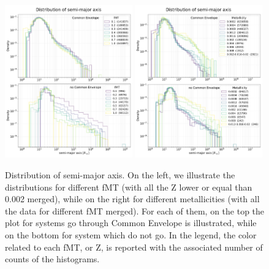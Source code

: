 \documentclass[prb,twocolumn,9pt]{revtex4-1}
\begin{document}
\begin{figure}[hp]
    \centering
    \includegraphics[width=0.49\textwidth]{images/assignment2_1/hist_sep_fMT.pdf}
    \hskip 1mm
   \includegraphics[width=0.49\textwidth]{images/assignment2_1/hist_sep_metal.pdf}
   \vskip -0.2cm
    \caption{ Distribution of semi-major axis. On the left, we illustrate the distributions for different fMT (with all the Z lower or equal than 0.002 merged), while on the right for different metallicities (with all the data for different fMT merged). For each of them, on the top the plot for systems go through Common Envelope is illustrated, while on the bottom for system which do not go. In the legend, the color related to each  fMT, or Z, is reported  with the associated number of counts of the histograms. }
     \label{fig:ass2_1_sep}
\end{figure}

\clearpage


\nocite{mapelli2018astrophysics}
\nocite{dina}
\nocite{2018MNRAS.480.2011G}
\nocite{2020ApJ...891..141G}
\nocite{2018MNRAS.474.2959G}
\nocite{2012ApJ...759...52D}
\nocite{2019MNRAS.490.3740N}

\printbibliography
\vspace{0.65cm}
\end{document}
